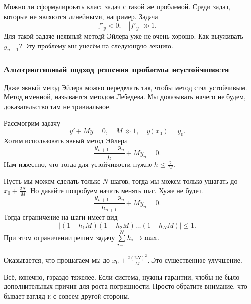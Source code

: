 Можно ли сформулировать класс задач с такой же проблемой. Среди задач, которые не являются линейными, например. Задача
\[
  f'_y<0;\quad |f'_y|\gg1.
\]
Для такой задаче неявный методй Эйлера уже не очень хорошо. Как выуживать $y_{n+1}$? Эту проблему мы унесём на следующую лекцию.
\subsubsection{Альтернативный подход решения проблемы неустойчивости}
Даже явный метод Эйлера можно переделать так, чтобы метод стал устойчивым. Метод именной, называется методом Лебедева. Мы доказывать ничего не будем, доказательство там не тривиальное.

Рассмотрим задачу
\[
  y' + M y = 0,\quad M\gg 1,\quad y(x_0) = y_0.
\]
Хотим использовать явный метод Эйлера
\[
  \frac{y_{n+1} - y_n}h + M y_n = 0.
\]
Нам известно, что тогда для устойчивости нужно $h\le\frac 2M$.

Пусть мы можем сделать только  $N$ шагов, тогда мы можем только ушагать до $x_0 + \frac {2N}M$. Но давайте попробуем начать менять шаг. Хуже не будет.
\[
  \frac{y_{n+1} - y_n}{h_{n+1}} + M y_n = 0.
\]
Тогда ограничение на шаги имеет вид
\[
  \big|(1 - h_1M)(1-h_2M)\dots(1-h_NM)\big|\le 1.
\]
При этом ограничении решим задачу $\sum\limits_{i = 1}^{N} h_i\rightarrow \max$.

Оказывается, что прошагаем мы до $x_0 + \frac{2(2N)^2}M$. Это существенное улучшение.

Всё, конечно, гораздо тяжелее. Если система, нужны гарантии, чтобы не было дополнительных причин для роста погрешности. Просто обратите внимание, что бывает взгляд и с совсем другой стороны.
